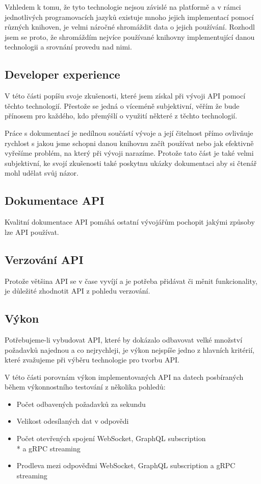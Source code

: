 \documentclass[thesis=M,czech]{FITthesis}[2019/12/23]
\begin{document}
Vzhledem k tomu, že tyto technologie nejsou závislé na platformě a v rámci jednotlivých programovacích jazyků existuje mnoho jejich implementací pomocí různých knihoven, je velmi náročné shromáždit data o jejich používání. Rozhodl jsem se proto, že shromáždím nejvíce používané knihovny implementující danou technologii a srovnání provedu nad nimi.

\subsection{Developer experience}
V této části popíšu svoje zkušenosti, které jsem získal při vývoji API pomocí těchto technologií. Přestože se jedná o víceméně subjektivní, věřím že bude přínosem pro každého, kdo přemýšlí o využití některé z těchto technologií.

Práce s dokumentací je nedílnou součástí vývoje a její čitelnost přímo ovlivňuje rychlost s jakou jsme schopni danou knihovnu začít používat nebo jak efektivně vyřešíme problém, na který při vývoji narazíme. Protože tato část je také velmi subjektivní, ke svojí zkušenosti také poskytnu ukázky dokumentaci aby si čtenář mohl udělat svůj názor. 

\subsection{Dokumentace API}
Kvalitní dokumentace API pomáhá ostatní vývojářům pochopit jakými způsoby lze API používat.

\subsection{Verzování API}
Protože většina API se v čase vyvíjí a je potřeba přidávat či měnit funkcionality, je důležité zhodnotit API z pohledu verzování.

\subsection{Výkon}
Potřebujeme-li vybudovat API, které by dokázalo odbavovat velké množství požadavků najednou a co nejrychleji, je výkon nejspíše jedno z hlavních kritérií, které zvažujeme při výběru technologie pro tvorbu API.

V této části porovnám výkon implementovaných API na datech posbíraných během výkonnostního testování z několika pohledů:

\begin{itemize}
    \item Počet odbavených požadavků za sekundu
    \item Velikost odesílaných dat v odpovědi
    \item Počet otevřených spojení WebSocket, GraphQL subscription \\* a gRPC streaming
    \item Prodleva mezi odpověďmi WebSocket, GraphQL subscription a gRPC streaming
\end{itemize}
\end{document}
